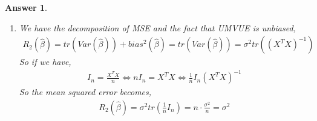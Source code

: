 \documentclass[12pt]{article}
\theoremstyle{colon}
\newtheorem*{answer}{Answer}
\begin{document}
\begin{answer}
\begin{enumerate}[label=\arabic*)]
\begin{gather*}
        = \mathbb{E}[(\widehat{\beta} - \beta)(\widehat{\beta} - \beta)^T] \\
        = \mathbb{E}[((X^TX)^{-1}X^Ty - \beta)((X^TX)^{-1}X^Ty - \beta)^T] \\
        = \mathbb{E}\big[((X^TX)^{-1}X^T(X\beta + \eta) - \beta) ((X^TX)^{-1}X^T(X\beta + \eta) - \beta) - \beta)^T \big] \\
        = \mathbb{E}[((X^TX)^{-1}X^T\eta)((X^TX)^{-1}X^T\eta)^T]
        = (X^TX)^{-1}X^T \mathbb{E}[\eta \eta^T] X (X^TX)^{-1} \\
        = (X^TX)^{-1}X^T \sigma^2 I_n X (X^TX)^{-1} = \sigma^2 (X^TX)^{-1} X^T X (X^TX)^{-1} = \sigma^2 (X^TX)^{-1}
      \end{gather*}
      Which matches the Cramer-Rao lower bound so we have that $\widehat{\beta}$ is an UMVUE of $\beta$.
    \item We have the decomposition of MSE and the fact that UMVUE is unbiased,
      \begin{gather*}
        R_2(\widehat{\beta}) = tr(Var(\widehat{\beta})) + bias^2(\widehat{\beta})
        = tr(Var(\widehat{\beta})) = \sigma^2 tr((X^TX)^{-1})
      \end{gather*}
      So if we have,
      \begin{gather*}
        I_n = \frac{X^TX}{n} \Longleftrightarrow n I_n = X^TX \Longleftrightarrow \frac{1}{n} I_n (X^TX)^{-1}
      \end{gather*}
      So the mean squared error becomes,
      \begin{gather*}
        R_2(\widehat{\beta}) = \sigma^2 tr(\frac{1}{n} I_n) = n \cdot \frac{\sigma^2}{n} = \sigma^2
      \end{gather*}
  \end{enumerate}
\end{answer}

\clearpage
\end{document}
